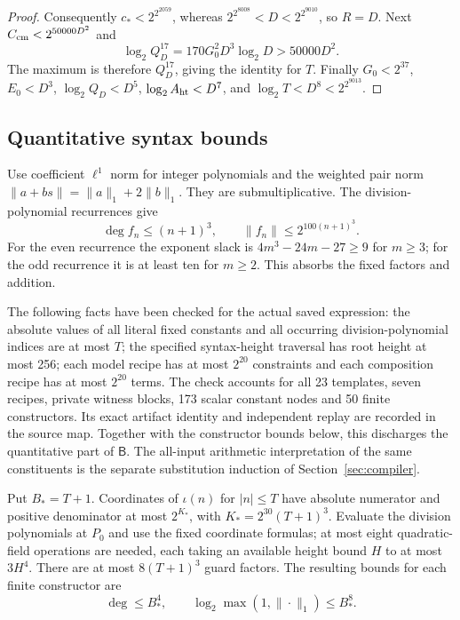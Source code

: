 \begin{proof}
Consequently $c_*<2^{2^{2059}}$, whereas
$2^{2^{8008}}<D<2^{2^{9010}}$, so $R=D$.
Next $C_{\rm cm}<2^{50000D^2}$ and
\[
 \log_2Q_D^{17}=170G_0^2D^3\log_2D>50000D^2.
\]
The maximum is therefore $Q_D^{17}$, giving the identity for $T$.
Finally $G_0<2^{37}$, $E_0<D^3$, $\log_2Q_D<D^5$,
$\log_2A_{\rm ht}<D^7$, and $\log_2T<D^8<2^{2^{9013}}$.
\end{proof}

\subsection{Quantitative syntax bounds}
Use coefficient $\ell^1$ norm for integer polynomials and the weighted
pair norm $\|a+bs\|=\|a\|_1+2\|b\|_1$. They are submultiplicative.
The division-polynomial recurrences give
\[
 \deg f_n\le(n+1)^3,\qquad\|f_n\|\le2^{100(n+1)^3}.
\]
For the even recurrence the exponent slack is
$4m^3-24m-27\ge9$ for $m\ge3$; for the odd recurrence it is at least
ten for $m\ge2$. This absorbs the fixed factors and addition.

The following facts have been checked for the actual saved expression:
the absolute values of all literal fixed constants and all occurring
division-polynomial indices are at most $T$; the specified syntax-height
traversal has root height at most 256; each model recipe has at most
$2^{20}$ constraints and each composition recipe has at most $2^{20}$
terms. The check accounts for all 23 templates, seven recipes, private
witness blocks, 173 scalar constant nodes and 50 finite constructors. Its exact
artifact identity and independent replay are recorded in the source map.
Together with the constructor bounds below, this discharges the
quantitative part of $\mathsf B$. The all-input arithmetic interpretation of the same constituents is the
separate substitution induction of Section~\ref{sec:compiler}.

Put $B_*=T+1$. Coordinates of $\iota(n)$ for
$|n|\le T$ have absolute numerator and positive denominator at most $2^{K_*}$, with
$K_*=2^{30}(T+1)^3$. Evaluate the division polynomials at $P_0$ and use
the fixed coordinate formulas; at most eight quadratic-field operations
are needed, each taking an available height bound $H$ to at most $3H^4$.
There are at most $8(T+1)^3$ guard factors. The resulting bounds for
each finite constructor are
\[
 \deg\le B_*^4,\qquad\log_2\max(1,\|\cdot\|_1)\le B_*^8.
\]


